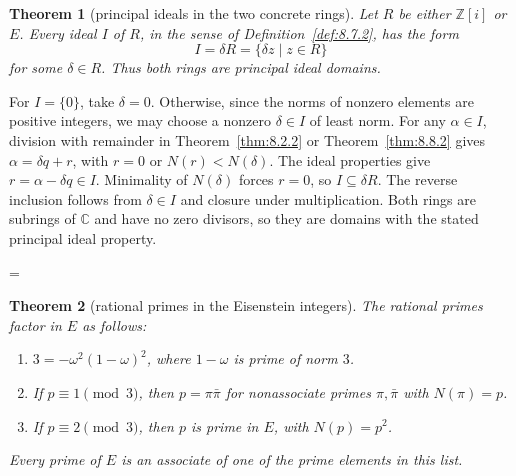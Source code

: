 \documentclass[11pt]{article}
\makeatletter
\theoremstyle{ntstyle}
\newtheorem{theorem}{Theorem}[subsection]
\let\nt@closedisplay\]
\def\nt@guardedclose{\@ifnextchar\par{\nt@closeafterpar}{\@ifnextchar\end{\postdisplaypenalty\@M\nt@closedisplay}{\nt@closedisplay}}}
\def\nt@closeafterpar\par{\@ifnextchar\par{\nt@closeafterpar}{\@ifnextchar\end{\postdisplaypenalty\@M\nt@closedisplay\par}{\nt@closedisplay\par}}}
\renewenvironment{proof}[1][\proofname]{\par
  \pushQED{\qed}\normalfont\topsep\medskipamount\edef\nt@afterproof{\@endparpenalty=\the\@endparpenalty\relax}\@beginparpenalty\@M\@endparpenalty\@M\let\]\nt@guardedclose\trivlist\item[]\textit{#1\@addpunct{.}} \ignorespaces}{\ifvmode\addpenalty\@M\fi\popQED\nt@afterproof\endtrivlist\@endpefalse}
\makeatother
\begin{document}
\begin{theorem}[principal ideals in the two concrete rings]\label{thm:8.8.3}
	Let $R$ be either $\mathbb{Z}[i]$ or $E$. Every ideal $I$ of $R$, in the
	sense of Definition~\ref{def:8.7.2}, has the form
	\[
		I=\delta R=\{\delta z\mid z\in R\}
	\]
	for some $\delta\in R$. Thus both rings are principal ideal domains.

\end{theorem}

\begin{proof}
	For $I=\{0\}$, take $\delta=0$. Otherwise, since the norms of nonzero elements are positive integers, we may choose a nonzero
	$\delta\in I$ of least norm.
	For any $\alpha\in I$, division with remainder in
	Theorem~\ref{thm:8.2.2} or Theorem~\ref{thm:8.8.2} gives
	$\alpha=\delta q+r$, with $r=0$ or $N(r)<N(\delta)$.
	The ideal properties give $r=\alpha-\delta q\in I$.
	Minimality of $N(\delta)$ forces $r=0$, so $I\subseteq\delta R$.
	The reverse inclusion follows from $\delta\in I$ and closure under
	multiplication. Both rings are subrings of $\mathbb{C}$ and have no zero
	divisors, so they are domains with the stated principal ideal property.

\end{proof}

\begin{theorem}[rational primes in the Eisenstein integers]\label{thm:8.8.4}
	The rational primes factor in $E$ as follows:
	\begin{enumerate}[label={\alph*)}]
		\item $3=-\omega^2(1-\omega)^2$, where $1-\omega$ is prime of norm $3$.
		\item If $p\equiv1\pmod3$, then $p=\pi\bar\pi$ for nonassociate primes
		      $\pi,\bar\pi$ with $N(\pi)=p$.
		\item If $p\equiv2\pmod3$, then $p$ is prime in $E$, with $N(p)=p^2$.
	\end{enumerate}
	Every prime of $E$ is an associate of one of the prime elements in this list.

\end{theorem}
\end{document}

